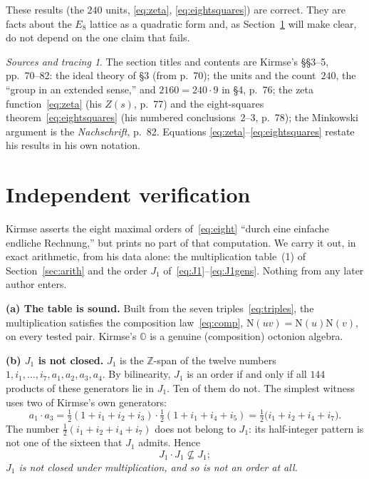 \documentclass[11pt]{amsart}
\newcommand{\OO}{\mathbb{O}}
\newcommand{\ZZ}{\mathbb{Z}}
\newcommand{\Nm}{\mathrm{N}}
\numberwithin{equation}{section}
\theoremstyle{definition}
\theoremstyle{plain}
\theoremstyle{remark}
\newtheorem*{tracing}{Sources and tracing}
\begin{document}
These results (the $240$ units, \eqref{eq:zeta}, \eqref{eq:eightsquares})
are correct.  They are facts about the $E_8$ lattice as a quadratic form
and, as Section~\ref{sec:verify} will make clear, do not depend on the one
claim that fails.

\begin{tracing}
The section titles and contents are Kirmse's \S\S3--5, \cite{Kirmse1924}
pp.~70--82: the ideal theory of \S3 (from p.~70); the units and the
count~$240$, the ``group in an extended sense,'' and $2160=240\cdot9$ in \S4,
p.~76; the zeta function~\eqref{eq:zeta} (his $Z(s)$, p.~77) and the
eight-squares theorem~\eqref{eq:eightsquares} (his numbered conclusions~2--3,
p.~78); the Minkowski argument is the \emph{Nachschrift}, p.~82.  Equations
\eqref{eq:zeta}--\eqref{eq:eightsquares} restate his results in his own
notation.
\end{tracing}

\section{Independent verification}\label{sec:verify}

Kirmse asserts the eight maximal orders of~\eqref{eq:eight} ``durch eine
einfache endliche Rechnung,'' but prints no part of that computation.  We
carry it out, in exact arithmetic, from his data alone: the multiplication
table~(1) of Section~\ref{sec:arith} and the order $J_1$
of~\eqref{eq:J1}--\eqref{eq:J1gens}.  Nothing from any later author enters.

\medskip\noindent\textbf{(a) The table is sound.}  Built from the seven
triples~\eqref{eq:triples}, the multiplication satisfies the composition
law~\eqref{eq:comp}, $\Nm(uv)=\Nm(u)\Nm(v)$, on every tested pair.  Kirmse's
$\OO$ is a genuine (composition) octonion algebra.

\medskip\noindent\textbf{(b) $J_1$ is not closed.}  $J_1$ is the
$\ZZ$-span of the twelve numbers $1,i_1,\ldots,i_7,a_1,a_2,a_3,a_4$.  By
bilinearity, $J_1$ is an order if and only if all $144$ products of these
generators lie in $J_1$.  Ten of them do not.  The simplest witness uses two
of Kirmse's own generators:
\begin{equation}\label{eq:witness}
  a_1\cdot a_3
  = \tfrac12(1{+}i_1{+}i_2{+}i_3)\cdot\tfrac12(1{+}i_1{+}i_4{+}i_5)
  = \tfrac12\bigl(i_1+i_2+i_4+i_7\bigr).
\end{equation}
The number $\tfrac12(i_1+i_2+i_4+i_7)$ does not belong to $J_1$: its
half-integer pattern is not one of the sixteen that $J_1$ admits.  Hence
\[
  J_1\cdot J_1 \not\subseteq J_1 ;
\]
\emph{$J_1$ is not closed under multiplication, and so is not an order at
all.}
\end{document}
